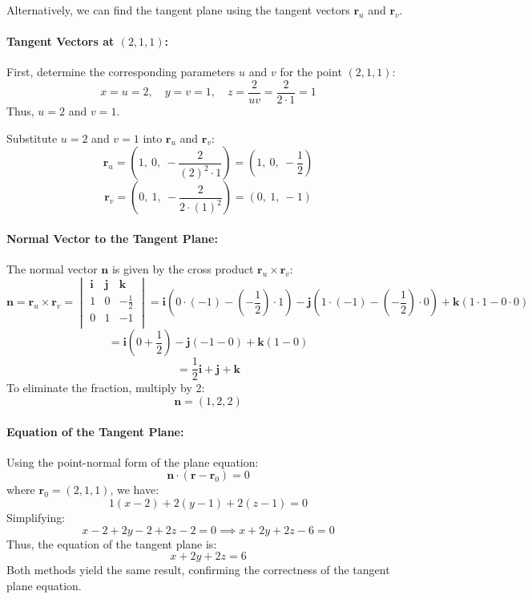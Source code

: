 \documentclass[11pt]{article}
\begin{document}
Alternatively, we can find the tangent plane using the tangent vectors \( \mathbf{r}_u \) and \( \mathbf{r}_v \).

\paragraph{Tangent Vectors at \( (2, 1, 1) \):}

First, determine the corresponding parameters \( u \) and \( v \) for the point \( (2, 1, 1) \):
\[
x = u = 2, \quad y = v = 1, \quad z = \frac{2}{uv} = \frac{2}{2 \cdot 1} = 1
\]
Thus, \( u = 2 \) and \( v = 1 \).

Substitute \( u = 2 \) and \( v = 1 \) into \( \mathbf{r}_u \) and \( \mathbf{r}_v \):
\[
\mathbf{r}_u = \left( 1,\ 0,\ -\frac{2}{(2)^2 \cdot 1} \right ) = \left( 1,\ 0,\ -\frac{1}{2} \right )
\]
\[
\mathbf{r}_v = \left( 0,\ 1,\ -\frac{2}{2 \cdot (1)^2} \right ) = \left( 0,\ 1,\ -1 \right )
\]
\paragraph{Normal Vector to the Tangent Plane:}

The normal vector \( \mathbf{n} \) is given by the cross product \( \mathbf{r}_u \times \mathbf{r}_v \):
\[
\mathbf{n} = \mathbf{r}_u \times \mathbf{r}_v =
\begin{vmatrix}
\mathbf{i} & \mathbf{j} & \mathbf{k} \\
1 & 0 & -\frac{1}{2} \\
0 & 1 & -1 \\
\end{vmatrix}
= \mathbf{i} \left( 0 \cdot (-1) - (-\frac{1}{2}) \cdot 1 \right )
- \mathbf{j} \left( 1 \cdot (-1) - (-\frac{1}{2}) \cdot 0 \right )
+ \mathbf{k} \left( 1 \cdot 1 - 0 \cdot 0 \right )
\]
\[
= \mathbf{i} \left( 0 + \frac{1}{2} \right )
- \mathbf{j} \left( -1 - 0 \right )
+ \mathbf{k} \left( 1 - 0 \right )
\]
\[
= \frac{1}{2} \mathbf{i} + \mathbf{j} + \mathbf{k}
\]
To eliminate the fraction, multiply by 2:
\[
\mathbf{n} = (1, 2, 2)
\]
\paragraph{Equation of the Tangent Plane:}

Using the point-normal form of the plane equation:
\[
\mathbf{n} \cdot ( \mathbf{r} - \mathbf{r}_0 ) = 0
\]
where \( \mathbf{r}_0 = (2, 1, 1) \), we have:
\[
1(x - 2) + 2(y - 1) + 2(z - 1) = 0
\]
Simplifying:
\[
x - 2 + 2y - 2 + 2z - 2 = 0 \implies x + 2y + 2z - 6 = 0
\]
Thus, the equation of the tangent plane is:
\[
\boxed{ x + 2y + 2z = 6 }
\]
Both methods yield the same result, confirming the correctness of the tangent plane equation.
\end{document}
